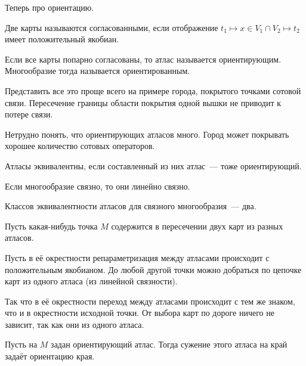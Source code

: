 \documentclass[draft,timbord]{longnotes}
\begin{document}
Теперь про ориентацию.

\begin{defn}\label{defn:dg::orient::map}
  Две карты называются согласованными, если отображение 
  $t_1 \mapsto  x\in V_1 \cap V_2 \mapsto t_2$ имеет положительный якобиан.
\end{defn}
\begin{defn}\label{defn:dg::orient::mapsmatch}
  Если все карты попарно согласованы, то атлас называется ориентирующим.
  Многообразие тогда называется ориентированным.
\end{defn}

Представить все это проще всего на примере города, покрытого точками сотовой связи.
Пересечение границы области покрытия одной вышки не приводит к потере связи.


Нетрудно понять, что ориентирующих атласов много. Город может покрывать
хорошее количество сотовых операторов.

\begin{defn}\label{defn:dg::orient::atleq}
  Атласы эквивалентны, если составленный из них атлас~--- тоже ориентирующий.
\end{defn}

\begin{prop}\label{prop:dg::orient::conn}
  Если многообразие связно, то они линейно связно.
\end{prop}
\begin{prop}\label{prop:dg::orient::atlbin}
  Классов эквивалентности атласов для связного многообразия~--- два.
\end{prop}
\begin{lproof}[\quest]
  Пусть какая-нибудь точка $M$ содержится в пересечении двух карт из разных атласов.

  Пусть в её окрестности репараметризация между атласами происходит с положительным якобианом.
  До любой другой точки можно добраться по цепочке карт из одного атласа (из линейной связности).

  Так что в её окрестности переход между атласами происходит с тем же знаком, что и в окрестности
  исходной точки. От выбора карт по дороге ничего не зависит, так как они из одного атласа.
\end{lproof}

\begin{defn}\label{defn:dg::orient::edge}
  Пусть на $M$ задан ориентирующий атлас. 
  Тогда сужение этого атласа на край задаёт ориентацию края.
\end{defn}
\end{document}

